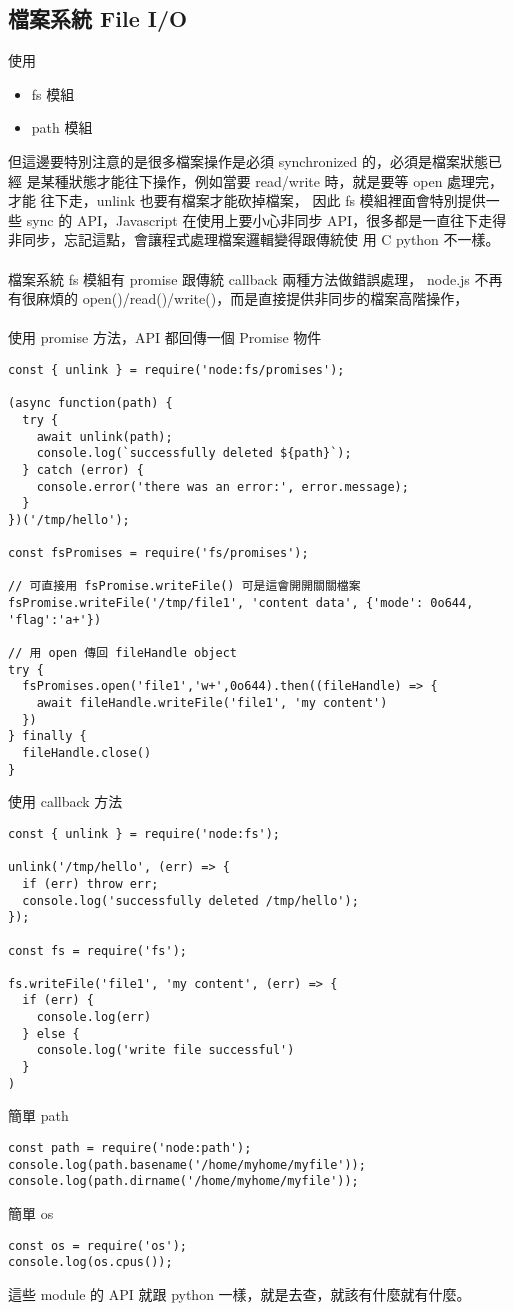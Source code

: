   \subsection{檔案系統 File I/O}
  使用
  \begin{itemize}
    \item fs 模組
    \item path 模組
  \end{itemize}
  但這邊要特別注意的是很多檔案操作是必須 synchronized 的，必須是檔案狀態已經
  是某種狀態才能往下操作，例如當要 read/write 時，就是要等 open 處理完，才能
  往下走，unlink 也要有檔案才能砍掉檔案，
  因此 fs 模組裡面會特別提供一些 sync 的 API，Javascript 在使用上要小心非同步
  API，很多都是一直往下走得非同步，忘記這點，會讓程式處理檔案邏輯變得跟傳統使
  用 C python 不一樣。
  \\\\
  檔案系統 fs 模組有 promise 跟傳統 callback 兩種方法做錯誤處理， node.js
  不再有很麻煩的 open()/read()/write()，而是直接提供非同步的檔案高階操作，
  \\\\
  使用 promise 方法，API 都回傳一個 Promise 物件
  \begin{verbatim}
const { unlink } = require('node:fs/promises');

(async function(path) {
  try {
    await unlink(path);
    console.log(`successfully deleted ${path}`);
  } catch (error) {
    console.error('there was an error:', error.message);
  }
})('/tmp/hello');

const fsPromises = require('fs/promises');

// 可直接用 fsPromise.writeFile() 可是這會開開關關檔案
fsPromise.writeFile('/tmp/file1', 'content data', {'mode': 0o644, 'flag':'a+'})

// 用 open 傳回 fileHandle object
try {
  fsPromises.open('file1','w+',0o644).then((fileHandle) => {
    await fileHandle.writeFile('file1', 'my content')
  })
} finally {
  fileHandle.close() 
}
  \end{verbatim}
  使用 callback 方法
  \begin{verbatim}
const { unlink } = require('node:fs');

unlink('/tmp/hello', (err) => {
  if (err) throw err;
  console.log('successfully deleted /tmp/hello');
});

const fs = require('fs');

fs.writeFile('file1', 'my content', (err) => {
  if (err) {
    console.log(err)
  } else {
    console.log('write file successful')
  }
)

  \end{verbatim}
  簡單 path
  \begin{verbatim}
const path = require('node:path'); 
console.log(path.basename('/home/myhome/myfile'));
console.log(path.dirname('/home/myhome/myfile'));
  \end{verbatim}
  簡單 os
  \begin{verbatim}
const os = require('os');
console.log(os.cpus());
  \end{verbatim}
  這些 module 的 API 就跟 python 一樣，就是去查，就該有什麼就有什麼。

